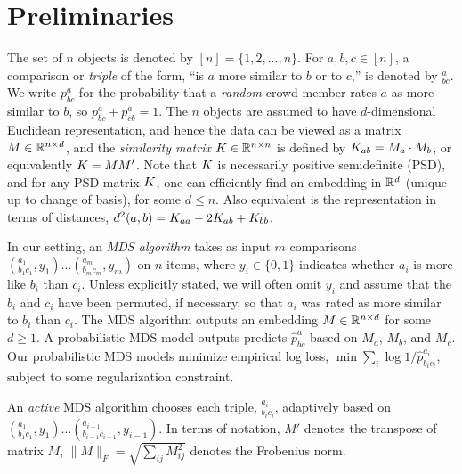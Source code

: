 \documentclass{article}
\begin{document}
\section{Preliminaries}\label{sec:prelim}

The set of $n$ objects is denoted by $[n]=\{1,2,\ldots,n\}$.  For $a,b,c \in [n]$, a comparison or {\em triple} of the form, ``is $a$ more similar to $b$ or to $c$,'' is denoted by $^a_{bc}$. We write $p^a_{bc}$ for the probability that a {\em random} crowd member rates $a$ as more similar to $b$, so $p^a_{bc}+p^a_{cb}=1$.
The $n$ objects are assumed to have $d$-dimensional Euclidean representation, and hence the data can be viewed as a matrix $M \in \reals^{n \times d}$, and the {\em similarity matrix} $\S \in \reals^{n \times n}$ is defined by $\S_{ab}=M_a\cdot M_b$, or equivalently $\S = MM'$.  Note that $\S$ is necessarily positive semidefinite (PSD), and for any PSD matrix $\S$, one can efficiently find an embedding in $\reals^d$ (unique up to change of basis), for some $d \leq n$.  Also equivalent is the representation in terms of distances, $d^2(a,b)=\S_{aa}-2\S_{ab}+\S_{bb}$.

In our setting, an {\em MDS algorithm} takes as input $m$ comparisons $(^{a_1}_{b_1c_1},y_1) \ldots (^{a_m}_{b_mc_m},y_m)$ on $n$ items, where $y_i\in \{0,1\}$ indicates whether $a_i$ is more like $b_i$ than $c_i$.  Unless explicitly stated, we will often omit $y_i$ and assume that the $b_i$ and $c_i$ have been permuted, if necessary, so that $a_i$ was rated as more similar to $b_i$ than $c_i$.  The MDS algorithm outputs an embedding $M \in \reals^{n \times d}$ for some $d \geq 1.$  A probabilistic MDS model outputs predicts $\hat{p}^{a}_{bc}$ based on $M_a$, $M_b$, and $M_c$.  Our probabilistic MDS models minimize empirical log loss, $\min \sum_i \log 1/\hat{p}^{a_i}_{b_ic_i}$, subject to some regularization constraint.

An {\em active} MDS algorithm chooses each triple, $^{a_i}_{b_ic_i}$, adaptively based on $(^{a_1}_{b_1c_1},y_1) \ldots (^{a_{i-1}}_{b_{i-1}c_{i-1}},y_{i-1})$.
In terms of notation, $M'$ denotes the transpose of matrix $M$, $\|M\|_F=\sqrt{\sum_{ij} M_{ij}^2}$ denotes the Frobenius norm.
\end{document}
